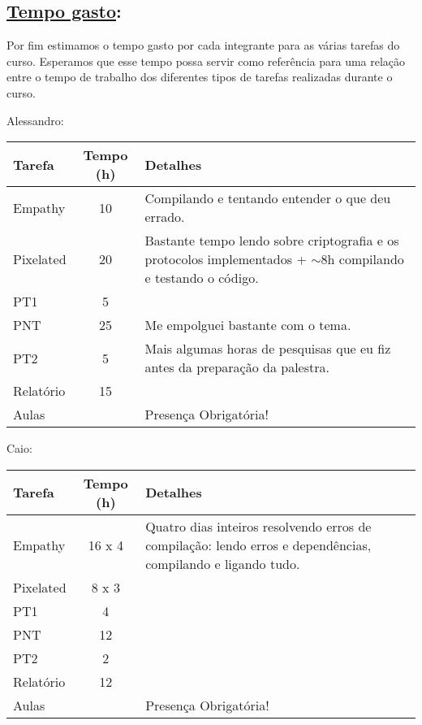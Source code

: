 \subsection*{\underline{Tempo gasto}:}

Por fim estimamos o tempo gasto por cada integrante para as várias tarefas do
curso. Esperamos que esse tempo possa servir como referência para uma relação
entre o tempo de trabalho dos diferentes tipos de tarefas realizadas durante o
curso.

Alessandro:
\begin{center}
    \begin{tabular}{ | l | c | p{7cm} |}
    \hline
    Tarefa & Tempo (h) & Detalhes \\ \hline
    Empathy & 10 & Compilando e tentando entender o que deu errado. \\ \hline
    Pixelated & 20 & Bastante tempo lendo sobre criptografia e os protocolos implementados + $\sim$8h compilando e testando o código. \\ \hline
    PT1 & 5 &  \\ \hline
    PNT & 25 & Me empolguei bastante com o tema. \\ \hline
    PT2 & 5 & Mais algumas horas de pesquisas que eu fiz antes da preparação da palestra. \\ \hline
    Relatório & 15 &  \\ \hline
    Aulas & & Presença Obrigatória! \\ \hline
    \end{tabular}
\end{center}

Caio:
\begin{center}
    \begin{tabular}{ | l | c | p{7cm} |}
    \hline
    Tarefa & Tempo (h) & Detalhes \\ \hline
    Empathy & 16 x 4 & Quatro dias inteiros resolvendo erros de compilação: lendo erros e dependências, compilando e ligando tudo. \\ \hline
    Pixelated & 8 x 3 &  \\ \hline
    PT1 & 4 &  \\ \hline
    PNT & 12 &  \\ \hline
    PT2 & 2 &  \\ \hline
    Relatório & 12 &  \\ \hline
    Aulas & & Presença Obrigatória! \\ \hline
    \end{tabular}
\end{center}

